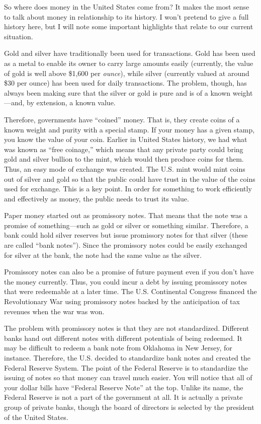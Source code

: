 So where does money in the United States come from?  It makes the most
sense to talk about money in relationship to its history. I won’t
pretend to give a full history here, but I will note some important
highlights that relate to our current situation.  

Gold and silver have traditionally been used for transactions. Gold has
been used as a metal to enable its owner to carry large amounts easily
(currently, the value of gold is well above \$1,600 per
\textit{ounce}), while silver (currently valued at around \$30 per
ounce) has been used for daily transactions. The problem, though, has
always been making sure that the silver or gold is pure and is of a
known weight—and, by extension, a known value. 

Therefore, governments have “coined” money. That is, they create coins
of a known weight and purity with a special stamp. If your money has a
given stamp, you know the value of your coin. Earlier in United States
history, we had what was known as “free coinage,” which means that any
private party could bring gold and silver bullion to the mint, which
would then produce coins for them. Thus, an easy mode of exchange was
created. The U.S. mint would mint coins out of silver and gold so that
the public could have trust in the value of the coins used for
exchange. This is a key point. In order for something to work
efficiently and effectively as money, the public needs to trust its
value.

Paper money started out as promissory notes. That means that the note
was a promise of something—such as gold or silver or something similar.
Therefore, a bank could hold silver reserves but issue promissory notes
for that silver (these are called “bank notes”). Since the promissory
notes could be easily exchanged for silver at the bank, the note had
the same value as the silver. 

Promissory notes can also be a promise of future payment even if you
don’t have the money
currently. Thus, you
could incur a debt by issuing promissory notes that were redeemable at
a later time. The U.S. Continental Congress financed the Revolutionary
War using promissory notes backed by the anticipation of tax revenues
when the war was won.

The problem with promissory notes is that they are not standardized.
Different banks hand out different notes with different potentials of
being redeemed. It may be difficult to redeem a bank note from Oklahoma
in New Jersey, for instance. Therefore, the U.S. decided to standardize
bank notes and created the Federal Reserve System. The point of the
Federal Reserve is to standardize the issuing of notes so that money
can travel much easier. You will notice that all of your dollar bills
have “Federal Reserve Note” at the top.  Unlike its name, the Federal
Reserve is not a part of the government at all.  It is actually a
private group of private banks, though the board of directors is
selected by the president of the United States.

